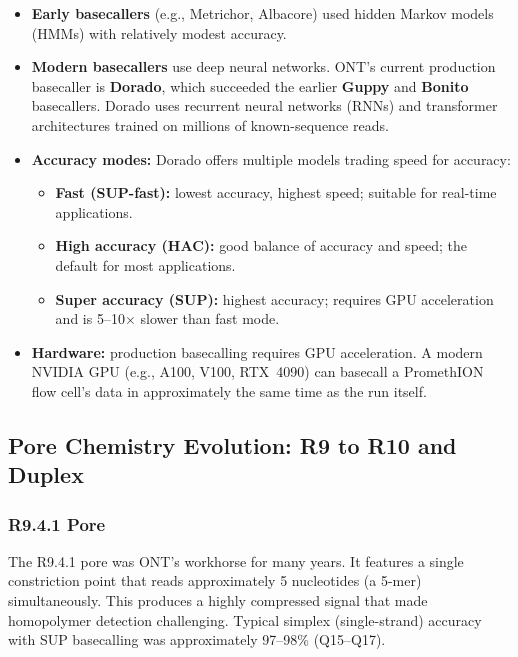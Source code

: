\begin{itemize}
  \item \textbf{Early basecallers} (e.g., Metrichor, Albacore) used hidden Markov models (HMMs) with relatively modest accuracy.

  \item \textbf{Modern basecallers} use deep neural networks. ONT's current production basecaller is \textbf{Dorado}, which succeeded the earlier \textbf{Guppy} and \textbf{Bonito} basecallers. Dorado uses recurrent neural networks (RNNs) and transformer architectures trained on millions of known-sequence reads.

  \item \textbf{Accuracy modes:} Dorado offers multiple models trading speed for accuracy:
    \begin{itemize}[nosep]
      \item \textbf{Fast (SUP-fast):} lowest accuracy, highest speed; suitable for real-time applications.
      \item \textbf{High accuracy (HAC):} good balance of accuracy and speed; the default for most applications.
      \item \textbf{Super accuracy (SUP):} highest accuracy; requires GPU acceleration and is 5--10$\times$ slower than fast mode.
    \end{itemize}

  \item \textbf{Hardware:} production basecalling requires GPU acceleration. A modern NVIDIA GPU (e.g., A100, V100, RTX~4090) can basecall a PromethION flow cell's data in approximately the same time as the run itself.
\end{itemize}

\subsection{Pore Chemistry Evolution: R9 to R10 and Duplex}

\subsubsection{R9.4.1 Pore}

The R9.4.1 pore was ONT's workhorse for many years. It features a single constriction point that reads approximately 5 nucleotides (a 5-mer) simultaneously. This produces a highly compressed signal that made homopolymer detection challenging. Typical simplex (single-strand) accuracy with SUP basecalling was approximately 97--98\% (Q15--Q17).

